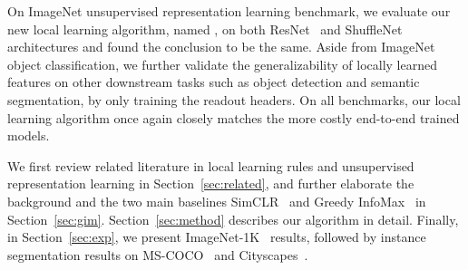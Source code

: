 On ImageNet unsupervised representation learning benchmark, we evaluate  our new local learning
algorithm, named {\ours},  on both ResNet~\cite{he2016deep} and ShuffleNet~\cite{ma2018shufflenet}
architectures and found the conclusion to be the same. Aside from ImageNet object classification, we
further validate the generalizability of locally learned features on other downstream tasks such as
object detection and semantic segmentation, by only training the readout headers. On all benchmarks,
our local learning algorithm once again closely matches the more costly end-to-end trained models.

We first review related literature in local learning rules and unsupervised representation learning
in Section~\ref{sec:related}, and further elaborate the background and the two main baselines
SimCLR~\cite{simclr} and Greedy InfoMax~\cite{e2e2e} in Section~\ref{sec:gim}.
Section~\ref{sec:method} describes our {\ours} algorithm in detail. Finally, in
Section~\ref{sec:exp}, we present ImageNet-1K~\cite{deng2009imagenet} results, followed by instance
segmentation results on MS-COCO~\cite{mscoco} and Cityscapes~\cite{cityscapes}.